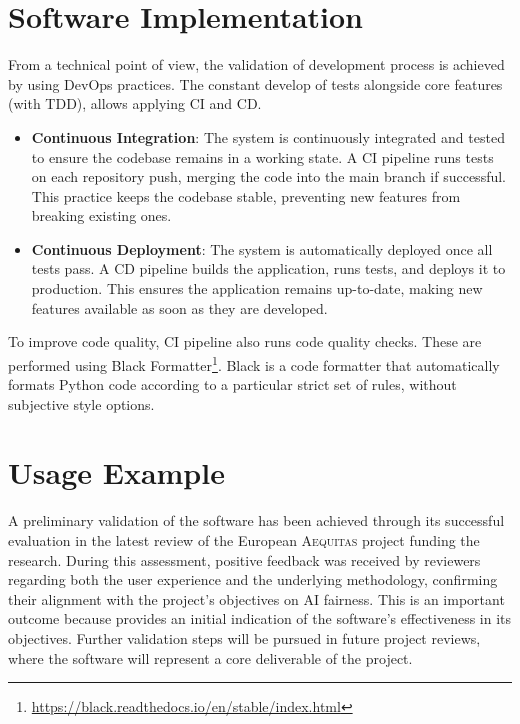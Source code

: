 \documentclass[12pt,a4paper,openright,twoside]{book}
\newcommand{\aequitas}{\textsc{Aequitas}}
\begin{document}
\section{Software Implementation}

From a technical point of view, the validation of development process is achieved by using DevOps practices.
%
The constant develop of tests alongside core features (with \ac{TDD}), allows applying \ac{CI} and \acf{CD}.

\begin{itemize}[label={}]
    \item \textbf{Continuous Integration}:  
    The system is continuously integrated and tested to ensure the codebase remains in a working state.
    A CI pipeline runs tests on each repository push, merging the code into the main branch if successful.
    This practice keeps the codebase stable, preventing new features from breaking existing ones.

    \item \textbf{Continuous Deployment}:  
    The system is automatically deployed once all tests pass.
    A CD pipeline builds the application, runs tests, and deploys it to production.
    This ensures the application remains up-to-date, making new features available as soon as they are developed.
\end{itemize}

To improve code quality, \ac{CI} pipeline also runs code quality checks.
%
These are performed using Black Formatter\footnote{\href{https://black.readthedocs.io/en/stable/index.html}{https://black.readthedocs.io/en/stable/index.html}}.
% 
Black is a code formatter that automatically formats Python code according to a particular strict set of rules, without subjective style options.




\section{Usage Example}

A preliminary validation of the software has been achieved through its successful evaluation in the latest review of the European \aequitas{} project funding the research.
%
During this assessment, positive feedback was received by reviewers regarding both the user experience and the underlying methodology, confirming their alignment with the project’s objectives on \ac{AI} fairness.
%
This is an important outcome because provides an initial indication of the software’s effectiveness in its objectives.
%
Further validation steps will be pursued in future project reviews, where the software will represent a core deliverable of the project.
\end{document}

